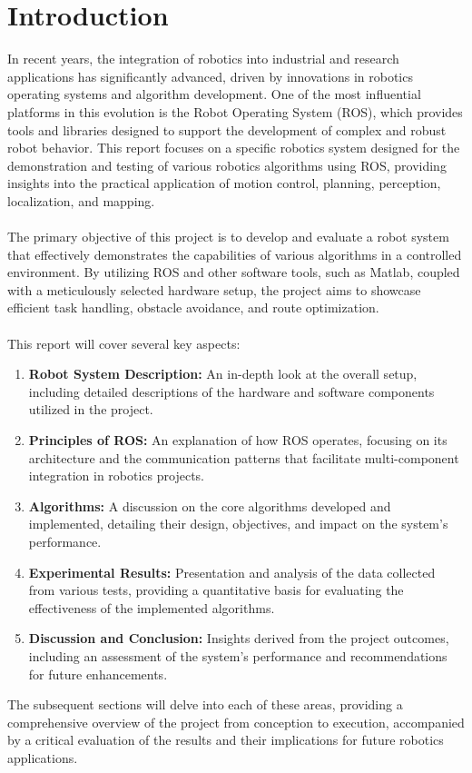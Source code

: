 \documentclass{article}
\begin{document}
	
	\clearpage
	
	\section{Introduction}
	In recent years, the integration of robotics into industrial and research applications has significantly advanced, driven by innovations in robotics operating systems and algorithm development. One of the most influential platforms in this evolution is the Robot Operating System (ROS), which provides tools and libraries designed to support the development of complex and robust robot behavior. This report focuses on a specific robotics system designed for the demonstration and testing of various robotics algorithms using ROS, providing insights into the practical application of motion control, planning, perception, localization, and mapping.
	\\\\
	The primary objective of this project is to develop and evaluate a robot system that effectively demonstrates the capabilities of various algorithms in a controlled environment. By utilizing ROS and other software tools, such as Matlab, coupled with a meticulously selected hardware setup, the project aims to showcase efficient task handling, obstacle avoidance, and route optimization.
	\\\\
	\noindent This report will cover several key aspects:
	\begin{enumerate}
		\item \textbf{Robot System Description:} An in-depth look at the overall setup, including detailed descriptions of the hardware and software components utilized in the project.
		\item \textbf{Principles of ROS:} An explanation of how ROS operates, focusing on its architecture and the communication patterns that facilitate multi-component integration in robotics projects.
		\item \textbf{Algorithms:} A discussion on the core algorithms developed and implemented, detailing their design, objectives, and impact on the system’s performance.
		\item \textbf{Experimental Results:} Presentation and analysis of the data collected from various tests, providing a quantitative basis for evaluating the effectiveness of the implemented algorithms.
		\item \textbf{Discussion and Conclusion:} Insights derived from the project outcomes, including an assessment of the system's performance and recommendations for future enhancements.
	\end{enumerate}
	The subsequent sections will delve into each of these areas, providing a comprehensive overview of the project from conception to execution, accompanied by a critical evaluation of the results and their implications for future robotics applications.
	
\end{document}
